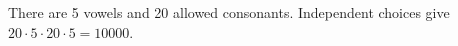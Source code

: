 There are 5 vowels and 20 allowed consonants. Independent choices give $20\cdot5\cdot20\cdot5=\boxed{10000}$.

